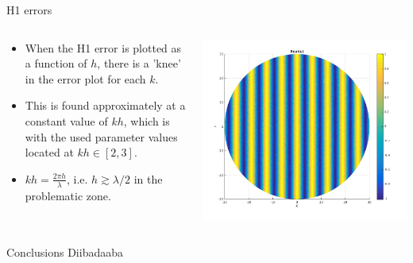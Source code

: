 \documentclass{beamer}
\begin{document}
\begin{frame}{H1 errors}
\begin{columns}
  \begin{column}{0.41\textwidth}
  \begin{itemize}
    \item When the H1 error is plotted as a function of $h$, there is a 'knee' in the error plot for each $k$.
    \item This is found approximately at a constant value of $kh$, which is with the used parameter values located at $kh \in [2,3]$.
    \item $kh = \frac{2\pi h}{\lambda}$, i.e. $h \gtrsim \lambda/2$ in the problematic zone.
  \end{itemize}    
  \end{column}
  \begin{column}{0.59\textwidth}
    \begin{center}
    \includegraphics[width=\textwidth]{planewave_real.png}
    \end{center}
  \end{column}
\end{columns}

\end{frame}

\begin{frame}{Conclusions}
 Diibadaaba
\end{frame}
\end{document}
